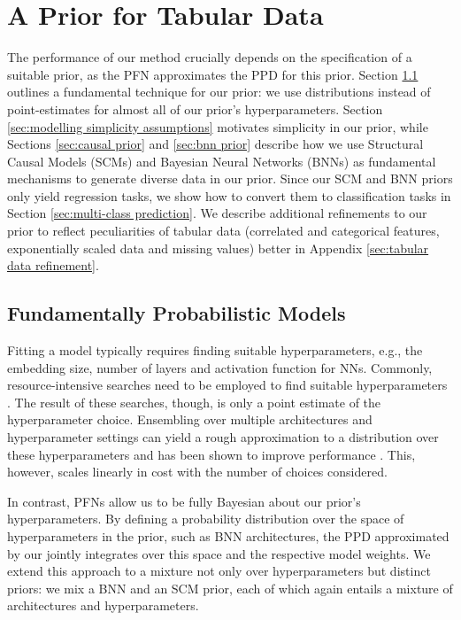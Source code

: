 \documentclass{article}
\begin{document}
\section{A Prior for Tabular Data}\label{sec:tabprior}
The performance of our method crucially depends on the specification of a suitable prior, as the PFN approximates the PPD for this prior.
Section \ref{sec:probabilistic prior} outlines a fundamental technique for our prior: we use distributions instead of point-estimates for almost all of our prior's hyperparameters. Section \ref{sec:modelling simplicity assumptions} motivates simplicity in our prior, while Sections \ref{sec:causal prior} and \ref{sec:bnn prior} describe how we use Structural Causal Models (SCMs) and Bayesian Neural Networks (BNNs) as fundamental mechanisms to generate diverse data in our prior. Since our SCM and BNN priors only yield regression tasks, we show how to convert them to classification tasks in Section \ref{sec:multi-class prediction}. We describe additional refinements to our prior to reflect peculiarities of tabular data (correlated and categorical features, exponentially scaled data and missing values) better in Appendix \ref{sec:tabular data refinement}.
%
\subsection{Fundamentally Probabilistic Models}
\label{sec:probabilistic prior}
Fitting a model typically requires finding suitable hyperparameters, e.g., the embedding size, number of layers and activation function for NNs. Commonly, resource-intensive searches need to be employed to find suitable hyperparameters \citep{zoph-iclr17a,feurer-automlbook19a}.
The result of these searches, though, is only a point estimate of the hyperparameter choice.
Ensembling over multiple architectures and hyperparameter settings can yield a rough approximation to a distribution over these hyperparameters and has been shown to improve performance \citep{zaidi-neurips21a,hyperensemble}.
This, however, scales linearly in cost with the number of choices considered.

In contrast, PFNs allow us to be fully Bayesian about our prior's hyperparameters. By defining a probability distribution over the space of hyperparameters in the prior, such as BNN architectures, the PPD approximated by our \methodname{} jointly integrates over this space and the respective model weights.
We extend this approach to a mixture not only over hyperparameters but distinct priors: we mix a BNN and an SCM prior,
each of which again entails a mixture of architectures and hyperparameters.
%
\end{document}
